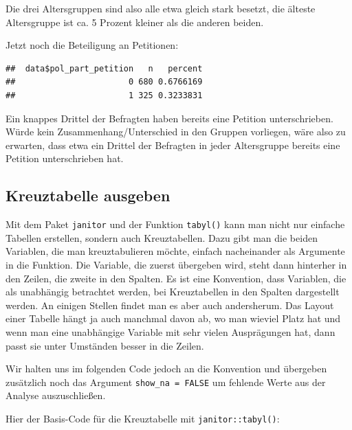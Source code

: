 \documentclass[
]{book}
\newenvironment{Shaded}{\begin{snugshade}}{\end{snugshade}}
\newcommand{\CommentTok}[1]{\textcolor[rgb]{0.56,0.35,0.01}{\textit{#1}}}
\newcommand{\FunctionTok}[1]{\textcolor[rgb]{0.00,0.00,0.00}{#1}}
\newcommand{\NormalTok}[1]{#1}
\newcommand{\SpecialCharTok}[1]{\textcolor[rgb]{0.00,0.00,0.00}{#1}}
\begin{document}
Die drei Altersgruppen sind also alle etwa gleich stark besetzt, die älteste Altersgruppe ist ca. 5 Prozent kleiner als die anderen beiden.

Jetzt noch die Beteiligung an Petitionen:

\begin{Shaded}
\end{Shaded}

\begin{verbatim}
##  data$pol_part_petition   n   percent
##                       0 680 0.6766169
##                       1 325 0.3233831
\end{verbatim}

Ein knappes Drittel der Befragten haben bereits eine Petition unterschrieben. Würde kein Zusammenhang/Unterschied in den Gruppen vorliegen, wäre also zu erwarten, dass etwa ein Drittel der Befragten in jeder Altersgruppe bereits eine Petition unterschrieben hat.

\hypertarget{kreuztabelle-ausgeben}{%
\subsection{Kreuztabelle ausgeben}\label{kreuztabelle-ausgeben}}

Mit dem Paket \texttt{janitor} und der Funktion \texttt{tabyl()} kann man nicht nur einfache Tabellen erstellen, sondern auch Kreuztabellen. Dazu gibt man die beiden Variablen, die man kreuztabulieren möchte, einfach nacheinander als Argumente in die Funktion. Die Variable, die zuerst übergeben wird, steht dann hinterher in den Zeilen, die zweite in den Spalten. Es ist eine Konvention, dass Variablen, die als unabhängig betrachtet werden, bei Kreuztabellen in den Spalten dargestellt werden. An einigen Stellen findet man es aber auch andersherum. Das Layout einer Tabelle hängt ja auch manchmal davon ab, wo man wieviel Platz hat und wenn man eine unabhängige Variable mit sehr vielen Ausprägungen hat, dann passt sie unter Umständen besser in die Zeilen.

Wir halten uns im folgenden Code jedoch an die Konvention und übergeben zusätzlich noch das Argument \texttt{show\_na\ =\ FALSE} um fehlende Werte aus der Analyse auszuschließen.

Hier der Basis-Code für die Kreuztabelle mit \texttt{janitor::tabyl()}:
\end{document}
